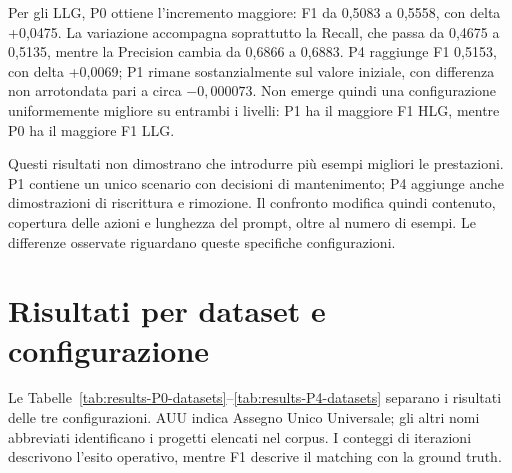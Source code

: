 Per gli LLG, P0 ottiene l'incremento maggiore: F1 da 0,5083 a 0,5558,
con delta +0,0475. La variazione accompagna soprattutto la Recall,
che passa da 0,4675 a 0,5135, mentre la Precision cambia da 0,6866
a 0,6883. P4 raggiunge F1 0,5153, con delta +0,0069; P1 rimane
sostanzialmente sul valore iniziale, con differenza non arrotondata
pari a circa $-0{,}000073$. Non emerge quindi una configurazione
uniformemente migliore su entrambi i livelli: P1 ha il maggiore F1
HLG, mentre P0 ha il maggiore F1 LLG.

Questi risultati non dimostrano che introdurre pi\`u esempi migliori
le prestazioni. P1 contiene un unico scenario con decisioni di
mantenimento; P4 aggiunge anche dimostrazioni di riscrittura e rimozione.
Il confronto modifica quindi contenuto, copertura delle azioni e
lunghezza del prompt, oltre al numero di esempi. Le differenze
osservate riguardano queste specifiche configurazioni.

\section{Risultati per dataset e configurazione}
Le Tabelle~\ref{tab:results-P0-datasets}--\ref{tab:results-P4-datasets}
separano i risultati delle tre configurazioni. AUU indica Assegno
Unico Universale; gli altri nomi abbreviati identificano i progetti
elencati nel corpus. I conteggi di iterazioni descrivono l'esito
operativo, mentre F1 descrive il matching con la ground truth.


